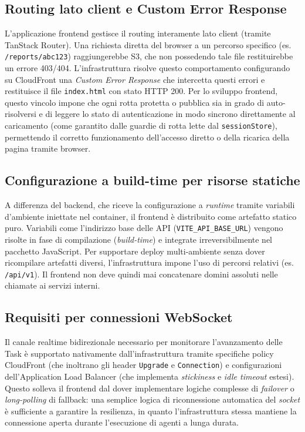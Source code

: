 \documentclass[11pt,a4paper]{article}
\begin{document}
\subsection{Routing lato client e Custom Error Response}

L'applicazione frontend gestisce il routing interamente lato client (tramite TanStack Router). Una richiesta diretta del browser a un percorso specifico (es. \texttt{/reports/abc123}) raggiungerebbe S3, che non possedendo tale file restituirebbe un errore 403/404. L'infrastruttura risolve questo comportamento configurando su CloudFront una \emph{Custom Error Response} che intercetta questi errori e restituisce il file \texttt{index.html} con stato HTTP 200. Per lo sviluppo frontend, questo vincolo impone che ogni rotta protetta o pubblica sia in grado di auto-risolversi e di leggere lo stato di autenticazione in modo sincrono direttamente al caricamento (come garantito dalle guardie di rotta lette dal \texttt{sessionStore}), permettendo il corretto funzionamento dell'accesso diretto o della ricarica della pagina tramite browser.

\subsection{Configurazione a build-time per risorse statiche}

A differenza del backend, che riceve la configurazione a \emph{runtime} tramite variabili d'ambiente iniettate nel container, il frontend è distribuito come artefatto statico puro. Variabili come l'indirizzo base delle API (\texttt{VITE\_API\_BASE\_URL}) vengono risolte in fase di compilazione (\emph{build-time}) e integrate irreversibilmente nel pacchetto JavaScript. Per supportare deploy multi-ambiente senza dover ricompilare artefatti diversi, l'infrastruttura impone l'uso di percorsi relativi (es. \texttt{/api/v1}). Il frontend non deve quindi mai concatenare domini assoluti nelle chiamate ai servizi interni.

\subsection{Requisiti per connessioni WebSocket}

Il canale realtime bidirezionale necessario per monitorare l'avanzamento delle Task è supportato nativamente dall'infrastruttura tramite specifiche policy CloudFront (che inoltrano gli header \texttt{Upgrade} e \texttt{Connection}) e configurazioni dell'Application Load Balancer (che implementa \emph{stickiness} e \emph{idle timeout} estesi). Questo solleva il frontend dal dover implementare logiche complesse di \emph{failover} o \emph{long-polling} di fallback: una semplice logica di riconnessione automatica del \emph{socket} è sufficiente a garantire la resilienza, in quanto l'infrastruttura stessa mantiene la connessione aperta durante l'esecuzione di agenti a lunga durata.
\end{document}
